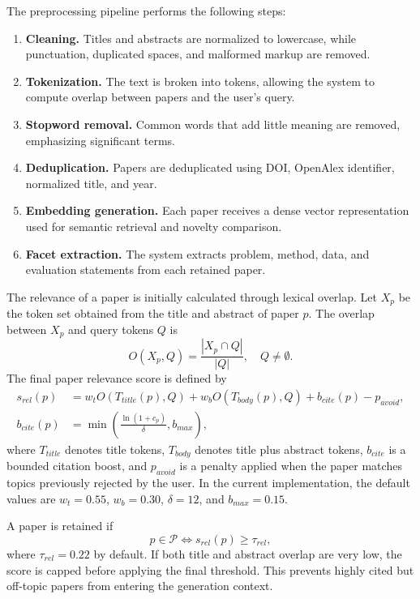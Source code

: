 \documentclass[preprint,12pt]{elsarticle}
\begin{document}
The preprocessing pipeline performs the following steps:
\begin{enumerate}
  \item \textbf{Cleaning.} Titles and abstracts are normalized to lowercase, while punctuation, duplicated spaces, and malformed markup are removed.
  \item \textbf{Tokenization.} The text is broken into tokens, allowing the system to compute overlap between papers and the user's query.
  \item \textbf{Stopword removal.} Common words that add little meaning are removed, emphasizing significant terms.
  \item \textbf{Deduplication.} Papers are deduplicated using DOI, OpenAlex identifier, normalized title, and year.
  \item \textbf{Embedding generation.} Each paper receives a dense vector representation used for semantic retrieval and novelty comparison.
  \item \textbf{Facet extraction.} The system extracts problem, method, data, and evaluation statements from each retained paper.
\end{enumerate}

The relevance of a paper is initially calculated through lexical overlap. Let $X_p$ be the token set obtained from the title and abstract of paper $p$. The overlap between $X_p$ and query tokens $Q$ is
\begin{equation}
  O(X_p,Q) = \frac{|X_p \cap Q|}{|Q|}, \quad Q \neq \emptyset.
\end{equation}
The final paper relevance score is defined by
\begin{align}
  s_{rel}(p) &= w_tO(T_{title}(p),Q) + w_bO(T_{body}(p),Q) + b_{cite}(p) - p_{avoid}, \label{eq:paper-rel}\\
  b_{cite}(p) &= \min\left(\frac{\ln(1+c_p)}{\delta}, b_{max}\right), \label{eq:cite-boost}
\end{align}
where $T_{title}$ denotes title tokens, $T_{body}$ denotes title plus abstract tokens, $b_{cite}$ is a bounded citation boost, and $p_{avoid}$ is a penalty applied when the paper matches topics previously rejected by the user. In the current implementation, the default values are $w_t=0.55$, $w_b=0.30$, $\delta=12$, and $b_{max}=0.15$.

A paper is retained if
\begin{equation}
  p \in \mathcal{P} \Leftrightarrow s_{rel}(p) \geq \tau_{rel},
\end{equation}
where $\tau_{rel}=0.22$ by default. If both title and abstract overlap are very low, the score is capped before applying the final threshold. This prevents highly cited but off-topic papers from entering the generation context.
\end{document}
